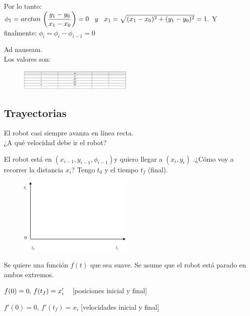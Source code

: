 Por lo tanto: $\phi_1 =  arctan \, \left( \dfrac{y_1-y_0}{x_1-x_0} \right) = 0 \hspace{0.3cm} y \hspace{0.3cm} x_1 = \sqrt{(x_1-x_0)^2 + (y_1-y_0)^2} = 1.$ Y finalmente: \hspace{0.3cm} $\phi_i=\phi_i-\phi_{i-1} = 0$

Ad nauseam. \\
Los valores son:

\begin{figure}[h!]
	\centering
	\includegraphics[width=0.5\textwidth]{images/img64.png}
	\label{figura64}
\end{figure}



\subsection{Trayectorias}

El robot casi siempre avanza en línea recta. \\
¿A qué velocidad debe ir el robot?

El robot está en $(x_{i-1},y_{i-1},\phi_{i-1}) $y quiero llegar a $(x_i,y_i)$ .¿Cómo voy a recorrer la distancia $x_i$?
Tengo $t_0$ y el tiempo $t_f$ (final).


\begin{figure}[h!]
	\centering
	\includegraphics[width=0.5\textwidth]{images/img65.png}
	\label{figura65}
\end{figure}


Se quiere una función $f(t)$ que sea suave. Se asume que el robot está parado en ambos extremos.

$f(0)=0, \, f(t_f)= x_i' \hspace{0.3cm}$ [posiciones inicial y final]

$f'(0)=0, \, f'(t_f)= x_i $ \hspace{0.3cm}[velocidades inicial y final]


